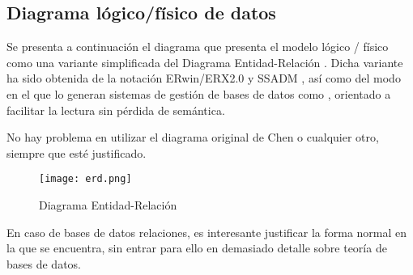 \subsection{Diagrama lógico/físico de datos}
\label{sec:erd}

Se presenta a continuación el diagrama que presenta el modelo lógico / físico como una variante simplificada del Diagrama Entidad-Relación \cite{chen1976entity}. Dicha variante ha sido obtenida de la notación ERwin/ERX2.0 \cite[p. 29]{song1995comparative} y \ac{SSADM} \cite[p. 193]{purchase2004comprehension}, así como del modo en el que lo generan sistemas de gestión de bases de datos como  \cite[p. 30]{komputer2010shortcourse}, orientado a facilitar la lectura sin pérdida de semántica.

\begin{shaded}
No hay problema en utilizar el diagrama original de Chen o cualquier otro, siempre que esté justificado.
\end{shaded}

\begin{figure}[H]
\centering
\texttt{[image: erd.png]}
\caption{Diagrama Entidad-Relación}
\label{fig:erd}
\end{figure}

\begin{shaded}
En caso de bases de datos relaciones, es interesante justificar la forma normal en la que se encuentra, sin entrar para ello en demasiado detalle sobre teoría de bases de datos.
\end{shaded}